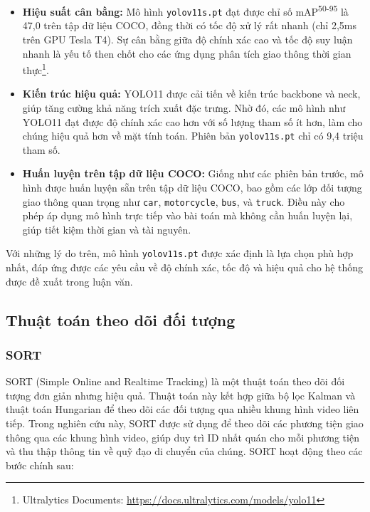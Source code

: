\begin{itemize}
    \item \textbf{Hiệu suất cân bằng:} Mô hình \texttt{yolov11s.pt} đạt được chỉ số mAP\textsuperscript{50-95} là 47,0 trên tập dữ liệu COCO, đồng thời có tốc độ xử lý rất nhanh (chỉ 2,5ms trên GPU Tesla T4). Sự cân bằng giữa độ chính xác cao và tốc độ suy luận nhanh là yếu tố then chốt cho các ứng dụng phân tích giao thông thời gian thực\footnote[1]{Ultralytics Documents: \url{https://docs.ultralytics.com/models/yolo11}}.
    \item \textbf{Kiến trúc hiệu quả:} YOLO11 được cải tiến về kiến trúc backbone và neck, giúp tăng cường khả năng trích xuất đặc trưng. Nhờ đó, các mô hình như YOLO11 đạt được độ chính xác cao hơn với số lượng tham số ít hơn, làm cho chúng hiệu quả hơn về mặt tính toán. Phiên bản \texttt{yolov11s.pt} chỉ có 9,4 triệu tham số.
    \item \textbf{Huấn luyện trên tập dữ liệu COCO:} Giống như các phiên bản trước, mô hình được huấn luyện sẵn trên tập dữ liệu COCO, bao gồm các lớp đối tượng giao thông quan trọng như \texttt{car}, \texttt{motorcycle}, \texttt{bus}, và \texttt{truck}. Điều này cho phép áp dụng mô hình trực tiếp vào bài toán mà không cần huấn luyện lại, giúp tiết kiệm thời gian và tài nguyên.
\end{itemize}
Với những lý do trên, mô hình \texttt{yolov11s.pt} được xác định là lựa chọn phù hợp nhất, đáp ứng được các yêu cầu về độ chính xác, tốc độ và hiệu quả cho hệ thống được đề xuất trong luận văn.

\subsection{Thuật toán theo dõi đối tượng}
\subsubsection{SORT}
SORT (Simple Online and Realtime Tracking) là một thuật toán theo dõi đối tượng đơn giản nhưng hiệu quả. Thuật toán này kết hợp giữa bộ lọc Kalman và thuật toán Hungarian để theo dõi các đối tượng qua nhiều khung hình video liên tiếp. Trong nghiên cứu này, SORT được sử dụng để theo dõi các phương tiện giao thông qua các khung hình video, giúp duy trì ID nhất quán cho mỗi phương tiện và thu thập thông tin về quỹ đạo di chuyển của chúng. SORT hoạt động theo các bước chính sau:

